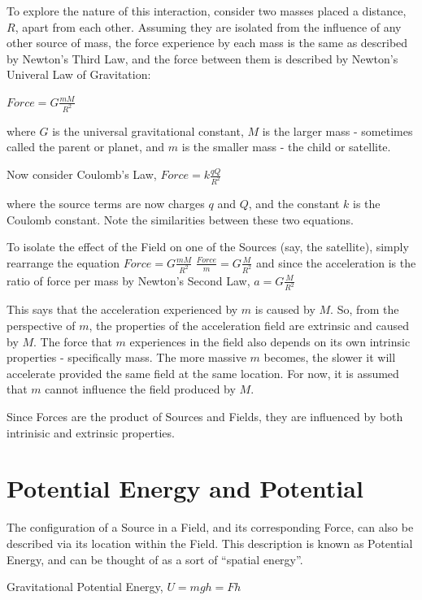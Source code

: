 \documentclass[
  letterpaper,
  DIV=11,
  numbers=noendperiod]{scrartcl}
\begin{document}
To explore the nature of this interaction, consider two masses placed a
distance, \(R\), apart from each other. Assuming they are isolated from
the influence of any other source of mass, the force experience by each
mass is the same as described by Newton's Third Law, and the force
between them is described by Newton's Univeral Law of Gravitation:

\(Force = G\frac{mM}{R^2}\)

where \(G\) is the universal gravitational constant, \(M\) is the larger
mass - sometimes called the parent or planet, and \(m\) is the smaller
mass - the child or satellite.

Now consider Coulomb's Law, \(Force = k\frac{qQ}{R^2}\)

where the source terms are now charges \(q\) and \(Q\), and the constant
\(k\) is the Coulomb constant. Note the similarities between these two
equations.

To isolate the effect of the Field on one of the Sources (say, the
satellite), simply rearrange the equation \(Force = G\frac{mM}{R^2}\)
\(\frac{Force}{m} = G\frac{M}{R^2}\) and since the acceleration is the
ratio of force per mass by Newton's Second Law, \(a = G\frac{M}{R^2}\)

This says that the acceleration experienced by \(m\) is caused by \(M\).
So, from the perspective of \(m\), the properties of the acceleration
field are extrinsic and caused by \(M\). The force that \(m\)
experiences in the field also depends on its own intrinsic properties -
specifically mass. The more massive \(m\) becomes, the slower it will
accelerate provided the same field at the same location. For now, it is
assumed that \(m\) cannot influence the field produced by \(M\).

Since Forces are the product of Sources and Fields, they are influenced
by both intrinisic and extrinsic properties.

\section{Potential Energy and
Potential}\label{potential-energy-and-potential}

The configuration of a Source in a Field, and its corresponding Force,
can also be described via its location within the Field. This
description is known as Potential Energy, and can be thought of as a
sort of ``spatial energy''.

Gravitational Potential Energy, \(U = mgh = Fh\)
\end{document}
